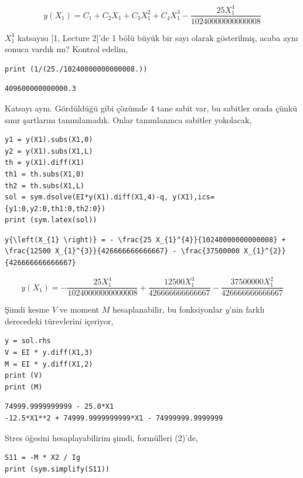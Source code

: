 \documentclass[12pt,fleqn]{article}\usepackage{../../common}
\begin{document}
$$
y{\left(X_{1} \right)} = C_{1} + C_{2} X_{1} + C_{3} X_{1}^{2} + C_{4} X_{1}^{3} - \frac{25 X_{1}^{4}}{10240000000000008}
$$

$X_1^4$ katsayısı [1, Lecture 2]'de 1 bölü büyük bir sayı olarak gösterilmiş,
acaba aynı sonuca vardık mı? Kontrol edelim,

\begin{verbatim}
print (1/(25./10240000000000008.))
\end{verbatim}

\begin{verbatim}
409600000000000.3
\end{verbatim}

Katsayı aynı. Gördüldüğü gibi çözümde 4 tane sabit var, bu sabitler orada çünkü
sınır şartlarını tanımlamadık. Onlar tanımlanınca sabitler yokolacak,

\begin{verbatim}
y1 = y(X1).subs(X1,0)
y2 = y(X1).subs(X1,L)
th = y(X1).diff(X1)
th1 = th.subs(X1,0)
th2 = th.subs(X1,L)
sol = sym.dsolve(EI*y(X1).diff(X1,4)-q, y(X1),ics={y1:0,y2:0,th1:0,th2:0})
print (sym.latex(sol))
\end{verbatim}

\begin{verbatim}
y{\left(X_{1} \right)} = - \frac{25 X_{1}^{4}}{10240000000000008} + \frac{12500 X_{1}^{3}}{426666666666667} - \frac{37500000 X_{1}^{2}}{426666666666667}
\end{verbatim}

$$
y{\left(X_{1} \right)} = - \frac{25 X_{1}^{4}}{10240000000000008} + \frac{12500 X_{1}^{3}}{426666666666667} - \frac{37500000 X_{1}^{2}}{426666666666667}
$$

Şimdi kesme $V$ ve moment $M$ hesaplanabilir, bu fonksiyonlar $y$'nin farklı
derecedeki türevlerini içeriyor, 

\begin{verbatim}
y = sol.rhs
V = EI * y.diff(X1,3)
M = EI * y.diff(X1,2)
print (V)
print (M)
\end{verbatim}

\begin{verbatim}
74999.9999999999 - 25.0*X1
-12.5*X1**2 + 74999.9999999999*X1 - 74999999.9999999
\end{verbatim}

Stres öğesini hesaplayabilirim şimdi, formülleri (2)'de,

\begin{verbatim}
S11 = -M * X2 / Ig
print (sym.simplify(S11))
\end{verbatim}
\end{document}
